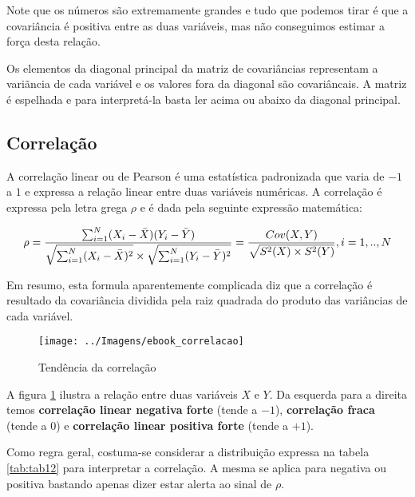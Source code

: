 \documentclass[12pt,]{style/krantz}
\renewenvironment{quote}{\begin{VF}}{\end{VF}}
\theoremstyle{definition}
\theoremstyle{definition}
\theoremstyle{definition}
\theoremstyle{remark}
\begin{document}
Note que os números são extremamente grandes e tudo que podemos tirar é que a covariância é positiva entre as duas variáveis, mas não conseguimos estimar a força desta relação.

\begin{quote}
Os elementos da diagonal principal da matriz de covariâncias representam a variãncia de cada variável e os valores fora da diagonal são covariâncais.
A matriz é espelhada e para interpretá-la basta ler acima ou abaixo da diagonal principal.
\end{quote}

\hypertarget{correlacao}{%
\subsection{Correlação}\label{correlacao}}

A correlação linear ou de Pearson é uma estatística padronizada que varia de \(-1\) a \(1\) e expressa a relação linear entre duas variáveis numéricas. A correlação é expressa pela letra grega \(\rho\) e é dada pela seguinte expressão matemática:

\[\rho = \frac {\sum_{i=1}^N(X_i-\bar X)(Y_i - \bar Y)}{\sqrt{\sum_{i=1}^N(X_i-\bar X)^2} \times \sqrt{\sum_{i=1}^N(Y_i-\bar Y)^2}}=\frac{Cov(X,Y)}{\sqrt{S^2(X) \times S^2(Y)}}, \\ i=1,..,N\]

Em resumo, esta formula aparentemente complicada diz que a correlação é resultado da covariância dividida pela raiz quadrada do produto das variâncias de cada variável.

\begin{figure}[H]

{\centering \texttt{[image: ../Imagens/ebook\_correlacao]} 

}

\caption{Tendência da correlação}\label{fig:fig11}
\end{figure}

A figura \ref{fig:fig11} ilustra a relação entre duas variáveis \(X\) e \(Y\). Da esquerda para a direita temos \textbf{correlação linear negativa forte} (tende a \(-1\)), \textbf{correlação fraca} (tende a \(0\)) e \textbf{correlação linear positiva forte} (tende a \(+1\)).

Como regra geral, costuma-se considerar a distribuição expressa na tabela \ref{tab:tab12} para interpretar a correlação. A mesma se aplica para negativa ou positiva bastando apenas dizer estar alerta ao sinal de \(\rho\).
\end{document}
